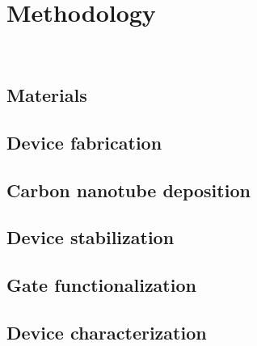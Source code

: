 \chapter{Methodology}
\label{cap:chapter2}

\newpage
\thispagestyle{empty}
\ %
\newpage

\section{Materials} 
\label{sec:materials}




\section{Device fabrication} 
\label{sec:fabrication}




\section{Carbon nanotube deposition}
\label{sec:cntDeposition}




\section{Device stabilization}
\label{sec:membrane_stabilization}




\section{Gate functionalization} 
\label{sec:functionalization}




\section{Device characterization}
\label{sec:characterization}




\newpage
\thispagestyle{empty}
\ %
\newpage